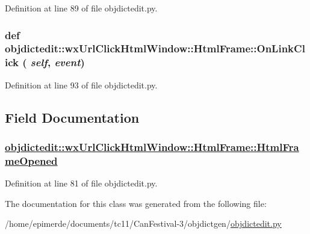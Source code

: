 Definition at line 89 of file objdictedit.py.\hypertarget{classobjdictedit_1_1wxUrlClickHtmlWindow_1_1HtmlFrame_bf60307dc144170d58195467361d5aa4}{
\subsubsection[OnLinkClick]{\setlength{\rightskip}{0pt plus 5cm}def objdictedit::wx\-Url\-Click\-Html\-Window::Html\-Frame::On\-Link\-Click ( {\em self},  {\em event})}}
\label{classobjdictedit_1_1wxUrlClickHtmlWindow_1_1HtmlFrame_bf60307dc144170d58195467361d5aa4}




Definition at line 93 of file objdictedit.py.

\subsection{Field Documentation}
\hypertarget{classobjdictedit_1_1wxUrlClickHtmlWindow_1_1HtmlFrame_1eafdd26ade3a7888626bee2f19a5ce4}{
\subsubsection[HtmlFrameOpened]{\setlength{\rightskip}{0pt plus 5cm}\hyperlink{classobjdictedit_1_1wxUrlClickHtmlWindow_1_1HtmlFrame_1eafdd26ade3a7888626bee2f19a5ce4}{objdictedit::wx\-Url\-Click\-Html\-Window::Html\-Frame::Html\-Frame\-Opened}}}
\label{classobjdictedit_1_1wxUrlClickHtmlWindow_1_1HtmlFrame_1eafdd26ade3a7888626bee2f19a5ce4}




Definition at line 81 of file objdictedit.py.

The documentation for this class was generated from the following file:\begin{CompactItemize}
\item 
/home/epimerde/documents/tc11/Can\-Festival-3/objdictgen/\hyperlink{objdictedit_8py}{objdictedit.py}\end{CompactItemize}
